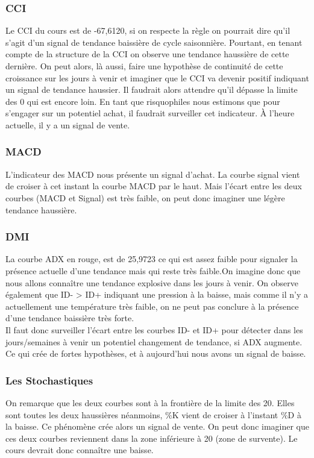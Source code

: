 \documentclass[12pt,a4paper]{article}
\begin{document}
\subsubsection*{CCI}
Le CCI du cours est de -67,6120, si on respecte la règle on pourrait dire qu'il s'agit d'un signal de tendance baissière de cycle saisonnière. Pourtant, en tenant compte 
de la structure de la CCI on observe une tendance haussière de cette dernière. On peut alors, là aussi, faire une hypothèse de continuité de cette croissance sur les jours 
à venir et imaginer que le CCI va devenir positif indiquant un signal de tendance haussier. Il faudrait alors attendre qu'il dépasse la limite des 0 qui est encore loin. 
En tant que risquophiles nous estimons que pour s'engager sur un potentiel achat, il faudrait surveiller cet indicateur. À l'heure actuelle, il y a un signal de vente. 
\subsubsection*{MACD}
L'indicateur des MACD nous présente un signal d'achat. La courbe signal vient de croiser à cet instant la courbe MACD par le haut. Mais l'écart entre les deux courbes 
(MACD et Signal) est très faible, on peut donc imaginer une légère tendance haussière.
\subsubsection*{DMI} 
La courbe ADX en rouge, est de 25,9723 ce qui est assez faible pour signaler la présence actuelle d'une tendance mais qui reste très faible.On imagine donc que nous allons 
connaître une tendance explosive dans les jours à venir. On observe également que ID- > ID+ indiquant une pression à la baisse, mais comme il n'y a actuellement une 
température très faible, on ne peut pas conclure à la présence d'une tendance baissière très forte.\\
Il faut donc surveiller l'écart entre les courbes ID- et ID+ pour détecter dans les jours/semaines à venir un potentiel changement de tendance, si ADX augmente. Ce qui 
crée de fortes hypothèses, et à aujourd'hui nous avons un signal de baisse.
\subsubsection*{Les Stochastiques}
On remarque que les deux courbes sont à la frontière de la limite des 20. Elles sont toutes les deux haussières néanmoins, \%K vient de croiser à l'instant \%D à la 
baisse. Ce phénomène crée alors un signal de vente. On peut donc imaginer que ces deux courbes reviennent dans la zone inférieure à 20 (zone de survente). Le cours devrait 
donc connaître une baisse.
\end{document}
